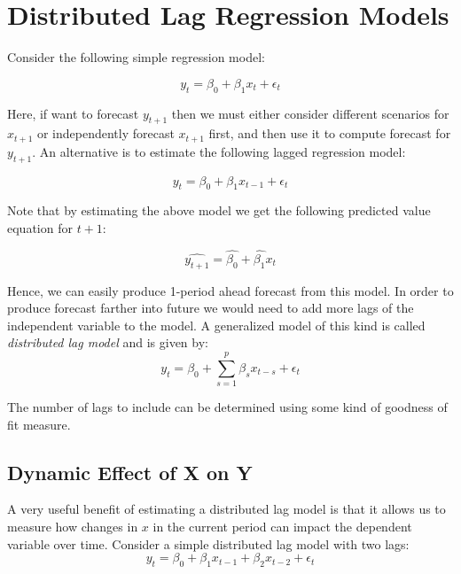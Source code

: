 \documentclass[]{book}
\theoremstyle{definition}
\theoremstyle{definition}
\theoremstyle{definition}
\theoremstyle{remark}
\begin{document}
\hypertarget{distributed-lag-regression-models}{%
\section{Distributed Lag Regression Models}\label{distributed-lag-regression-models}}

Consider the following simple regression model:

\begin{equation}
y_t= \beta_0 +\beta_1 x_t + \epsilon_t
\end{equation}

Here, if want to forecast \(y_{t+1}\) then we must either consider different scenarios for \(x_{t+1}\) or independently forecast \(x_{t+1}\) first, and then use it to compute forecast for \(y_{t+1}\). An alternative is to estimate the following lagged regression model:

\begin{equation}
y_t= \beta_0 +\beta_1 x_{t-1} + \epsilon_t
\end{equation}

Note that by estimating the above model we get the following predicted value equation for \(t+1\):

\begin{equation}
\widehat{y_{t+1}}=\widehat{\beta_0}+\widehat{\beta_1}x_{t}
\end{equation}

Hence, we can easily produce 1-period ahead forecast from this model. In order to produce forecast farther into future we would need to add more lags of the independent variable to the model. A generalized model of this kind is called \emph{distributed lag model} and is given by:
\begin{equation}
y_t= \beta_0 +\sum_{s=1}^p\beta_s x_{t-s} + \epsilon_t
\end{equation}

The number of lags to include can be determined using some kind of goodness of fit measure.

\hypertarget{dynamic-effect-of-x-on-y}{%
\subsection{Dynamic Effect of X on Y}\label{dynamic-effect-of-x-on-y}}

A very useful benefit of estimating a distributed lag model is that it allows us to measure how changes in \(x\) in the current period can impact the dependent variable over time. Consider a simple distributed lag model with two lags:
\begin{equation}
y_t=\beta_0 + \beta_1 x_{t-1} + \beta_2 x_{t-2} +\epsilon_t
\end{equation}
\end{document}
